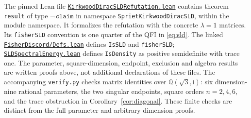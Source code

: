 \documentclass[11pt]{article}
\newcommand{\ii}{\mathrm{i}}
\begin{document}
The pinned Lean file
\href{https://github.com/the-omega-institute/trureturing/blob/71b4592f31a0ce564acedcbee195fbd50f30bd8c/D5/S3/Quantum/Information/KirkwoodDiracSLDRefutation.lean}{\texttt{KirkwoodDiracSLDRefutation.lean}}
contains theorem \texttt{result} of type $\neg\,\mathtt{claim}$ in namespace
\texttt{SprietKirkwoodDiracSLD}, within the module namespace.
It formalizes the refutation with the concrete $\lambda=1$ matrices.
Its \texttt{fisherSLD} convention is one quarter of the QFI in
\eqref{eq:sld}. The linked
\href{https://github.com/the-omega-institute/trureturing/blob/71b4592f31a0ce564acedcbee195fbd50f30bd8c/D5/S3/Quantum/Information/FisherDiscord/Defs.lean}{\texttt{FisherDiscord/Defs.lean}}
defines \texttt{IsSLD} and \texttt{fisherSLD};
\href{https://github.com/the-omega-institute/trureturing/blob/71b4592f31a0ce564acedcbee195fbd50f30bd8c/D5/S3/Quantum/Information/SLDSpectralEnergy.lean}{\texttt{SLDSpectralEnergy.lean}}
defines \texttt{IsDensity} as positive semidefinite with trace one.
The parameter, square-dimension, endpoint, exclusion and algebra results
are written proofs above, not additional declarations of these files.
The accompanying \texttt{verify.py} checks matrix identities over
$\mathbb Q(\sqrt3,\ii)$: six dimension-nine rational parameters,
the two singular endpoints, square orders $n=2,4,6$, and the trace
obstruction in Corollary~\ref{cor:diagonal}. These finite checks are
distinct from the full parameter and arbitrary-dimension proofs.
\end{document}
